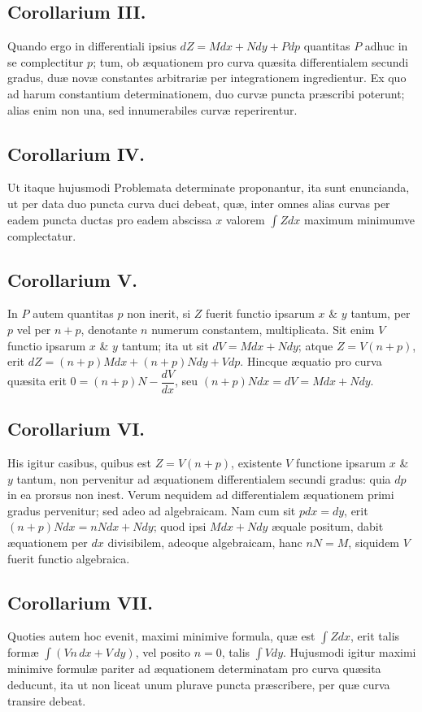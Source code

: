 \subsection*{Corollarium III.}
Quando ergo in differentiali ipsius $dZ=Mdx+Ndy+Pdp$ quantitas $P$ adhuc in se complectitur $p$; tum, ob æquationem pro curva quæsita differentialem secundi gradus, duæ novæ constantes arbitrariæ per integrationem ingredientur. Ex quo ad harum constantium determinationem, duo curvæ puncta præscribi poterunt; alias enim non una, sed innumerabiles curvæ reperirentur.

\subsection*{Corollarium IV.}
Ut itaque hujusmodi Problemata determinate proponantur, ita sunt enuncianda, ut per data duo puncta curva duci debeat, quæ, inter omnes alias curvas per eadem puncta ductas pro eadem abscissa $x$ valorem $\int Zdx$ maximum minimumve complectatur.

\subsection*{Corollarium V.}
In $P$ autem quantitas $p$ non inerit, si $Z$ fuerit functio ipsarum $x$ \& $y$ tantum, per $p$ vel per $n+p$, denotante $n$ numerum constantem, multiplicata. Sit enim $V$ functio ipsarum $x$ \& $y$ tantum; ita ut sit $dV=Mdx+Ndy$; atque $Z=V(n+p)$, erit $dZ=(n+p)Mdx+(n+p)Ndy+Vdp$. Hincque æquatio pro curva quæsita erit $0=(n+p)N-\dfrac{dV}{dx}$, seu $(n+p)Ndx=dV=Mdx+Ndy$.

\subsection*{Corollarium VI.}
His igitur casibus, quibus est $Z=V(n+p)$, existente $V$ functione ipsarum $x$ \& $y$ tantum, non pervenitur ad æquationem differentialem secundi gradus: quia $dp$ in ea prorsus non inest. Verum nequidem ad differentialem æquationem primi gradus pervenitur; sed adeo ad algebraicam. Nam cum sit $pdx=dy$, erit $(n+p)Ndx=nNdx+Ndy$; quod ipsi $Mdx+Ndy$ æquale positum, dabit æquationem per $dx$ divisibilem, adeoque algebraicam, hanc $nN=M$, siquidem $V$ fuerit functio algebraica.

\subsection*{Corollarium VII.}
Quoties autem hoc evenit, maximi minimive formula, quæ est $\int Zdx$, erit talis formæ $\int(Vn\,dx+V\,dy)$, vel posito $n=0$, talis $\int Vdy$. Hujusmodi igitur maximi minimive formulæ pariter ad æquationem determinatam pro curva quæsita deducunt, ita ut non liceat unum plurave puncta præscribere, per quæ curva transire debeat.

